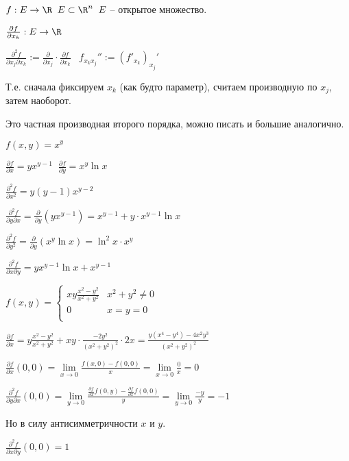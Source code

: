 
\begin{definition}\slashns
	
	$f: E \to \R \;\; E\subset \R^n \;\; E$ -- открытое множество.
	
	$\frac{\partial f}{\partial x_k} : E \to \R $
	
	$\frac{\partial^2 f}{\partial x_j \partial x_k} := \frac{\partial}{\partial x_j} \cdot \frac{\partial f}{\partial x_k} \;\;\; f_{x_k x_j}'' := (f'_{x_k})_{x_j}'$

	Т.е. сначала фиксируем $x_k$ (как будто параметр), считаем производную по $x_j$, затем наоборот.

	Это частная производная второго порядка, можно писать и большие аналогично.
\end{definition}

\begin{example}\slashns
	
	$f(x,y) = x^y$
	
	$\frac{\partial f}{\partial x} = yx^{y-1} \;\; \frac{\partial f}{\partial y} = x^y \ln x$
	
	$\frac{\partial^2 f }{\partial x^2} = y(y-1)x^{y-2}$
	
	$\frac{\partial^2 f}{\partial y \partial x} = \frac{\partial}{\partial y} (yx^{y-1}) = x^{y-1} + y\cdot x^{y-1} \ln x$
	
	$\frac{\partial^2 f}{\partial y^2 } = \frac{\partial}{\partial y}(x^y \ln x) = \ln^2 x \cdot x^y$
	
	$\frac{\partial^2 f}{\partial x \partial y} = yx^{y-1}\ln x + x^{y-1}$
\end{example}

\begin{example}\slashns
	
	$f(x, y) = \begin{cases}
	xy\frac{x^2 - y^2}{x^2+y^2} & x^2 + y^2 \ne 0\\
	0 & x=y=0\\
	\end{cases}$
	
	$\frac{\partial f}{\partial x} = y \frac{x^2 - y^2}{x^2+y^2} + xy \cdot \frac{-2y^2}{(x^2+y^2)^2}\cdot 2x = \frac{y(x^4-y^4) - 4x^2y^3}{(x^2 + y^2)^2}$
	
	$\frac{\partial f}{\partial x}(0, 0) = \lim\limits_{x \to 0} \frac{f(x, 0) - f(0, 0)}{x} = \lim\limits_{x \to 0} \frac{0}{x} = 0$
	
	$\frac{\partial^2 f}{\partial y \partial x}(0, 0) = \lim\limits_{y \to 0} \frac{\frac{\partial f}{\partial x}f(0, y) - \frac{\partial f}{\partial x}f(0, 0)}{y} = \lim\limits_{y \to 0} \frac{-y}{y} = -1 $
	
	Но в силу антисимметричности $x$ и $y$.
	
	$\frac{\partial^2 f}{\partial x \partial y}(0, 0) = 1$
\end{example}

